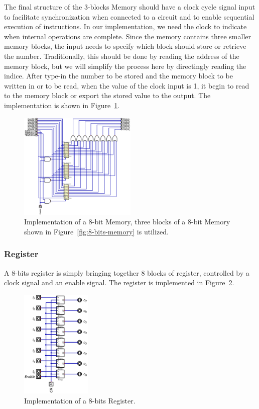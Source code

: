 \documentclass[conference]{IEEEtran}
\begin{document}
The final structure of the 3-blocks Memory should have a clock cycle signal input to facilitate synchronization when connected to a circuit and to enable sequential execution of instructions. In our implementation, we need the clock to indicate when internal operations are complete. Since the memory contains three smaller memory blocks, the input needs to specify which block should store or retrieve the number.
Traditionally, this should be done by reading the address of the memory block, but we will simplify the process here by directingly reading the indice. After type-in the number to be stored and the memory block to be written in or to be read, when the value of the clock input is 1, it begin to read to the memory block or export the stored value to the output. The implementation is shown in Figure~\ref{fig:8-bits-memories}.

\begin{figure}[h!]
    \centering
    \includegraphics[width=0.5\textwidth]{assets/8-bit-memories.png}
    \caption{Implementation of a 8-bit Memory, three blocks of a 8-bit Memory shown in Figure~\ref{fig:8-bits-memory} is utilized.}
    \label{fig:8-bits-memories}
\end{figure}

\subsubsection{Register}

A 8-bits register is simply bringing together 8 blocks of register, controlled by a clock signal and an enable signal. The register is implemented in Figure~\ref{fig:8-bits-register}.
\begin{figure}[h!]
    \centering
    \includegraphics[width=0.3\textwidth]{assets/8-bit-register.png}
    \caption{Implementation of a 8-bits Register.}
    \label{fig:8-bits-register}
\end{figure}
\end{document}
